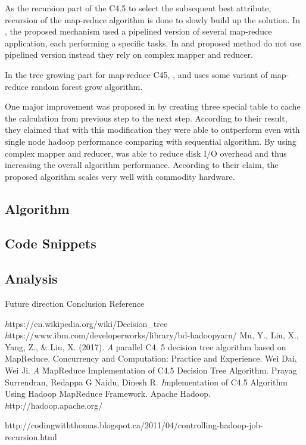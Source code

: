 \documentclass{article}
\begin{document}
\BlankLine
As the recursion part of the C4.5 to select the subsequent best attribute, recursion of the map-reduce algorithm is done to slowly build up the solution. In \cite{c45cn}, the proposed mechanism used a pipelined version of several map-reduce application, each performing a specific tasks. In \cite{c452017} and \cite{c45in} proposed method do not use pipelined version instead they rely on complex mapper and reducer.

\BlankLine
In the tree growing part for map-reduce C45, \cite{c452017}, \cite{c45cn} and \cite{c45in} uses some variant of map-reduce random forest grow algorithm.

\BlankLine
One major improvement was proposed in \cite{c45cn} by creating three special table to cache the calculation from previous step to the next step. According to their result, they claimed that with this modification they were able to outperform even with single node hadoop performance comparing with sequential algorithm. By using complex mapper and reducer, \cite{c452017} was able to reduce disk I/O overhead and thus increasing the overall algorithm performance. According to their claim, the proposed algorithm scales very well with commodity hardware.

\subsection{Algorithm}
\subsection{Code Snippets}
\subsection{Analysis}
Future direction
Conclusion
Reference

\begin{thebibliography}{9}
\textit https://en.wikipedia.org/wiki/Decision\_tree
\textit https://www.ibm.com/developerworks/library/bd-hadoopyarn/
Mu, Y., Liu, X., Yang, Z., \& Liu, X. (2017).
\textit A parallel C4. 5 decision tree algorithm based on MapReduce. Concurrency and Computation: Practice and Experience.
Wei Dai, Wei Ji.
\textit A MapReduce Implementation of C4.5 Decision Tree Algorithm.
Prayag Surrendran, Redappa G Naidu, Dinesh R. 
\textit Implementation of C4.5 Algorithm Using Hadoop MapReduce Framework.
Apache Hadoop.
\textit http://hadoop.apache.org/
\end{thebibliography}

http://codingwiththomas.blogspot.ca/2011/04/controlling-hadoop-job-recursion.html
\end{document}
